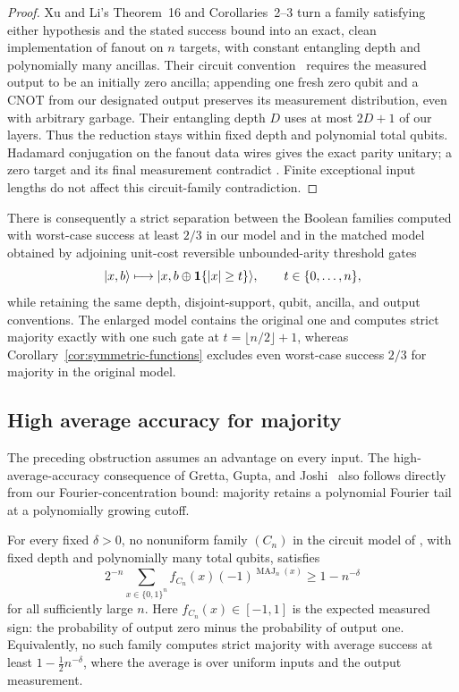 \begin{proof}
Xu and Li's Theorem~16 and Corollaries~2--3
\cite{XuLi2026Fanout} turn a family satisfying either hypothesis and the
stated success bound into an exact, clean implementation of fanout on
\(n\) targets, with constant entangling depth and polynomially many
ancillas. Their circuit convention~\cite[Section~2.3]{XuLi2026Fanout}
requires the measured output to be an initially zero ancilla; appending one fresh zero qubit and a CNOT from our designated
output preserves its measurement distribution, even with arbitrary
garbage. Their entangling depth \(D\) uses at most \(2D+1\) of our layers.
Thus the reduction stays within fixed depth and polynomial total qubits.
Hadamard conjugation on the fanout data wires gives the exact parity
unitary; a zero target and its final measurement contradict
. Finite exceptional input lengths do not affect this
circuit-family contradiction.
\end{proof}

There is consequently a strict separation between the Boolean families
computed with worst-case success at least \(2/3\) in our model and in the
matched model obtained by adjoining unit-cost reversible unbounded-arity
threshold gates
\[
 \lvert x,b\rangle\longmapsto
 \lvert x,b\mathbin{\oplus}\mathbf 1\{|x|\ge t\}\rangle,
 \qquad t\in\{0,\ldots,n\},
\]
while retaining the same depth, disjoint-support, qubit, ancilla, and
output conventions. The enlarged model contains the original one and
computes strict majority exactly with one such gate at
\(t=\lfloor n/2\rfloor+1\), whereas
Corollary~\ref{cor:symmetric-functions} excludes even worst-case success \(2/3\)
for majority in the original model.

\subsection{High average accuracy for majority}

The preceding obstruction assumes an advantage on every input. The
high-average-accuracy consequence of Gretta, Gupta, and
Joshi~\cite[Corollary~4.6]{GGJ2026} also follows directly from our
Fourier-concentration bound: majority retains a polynomial Fourier tail
at a polynomially growing cutoff.

\begin{corollary}
\label{cor:majority-average}
For every fixed \(\delta>0\), no nonuniform family \((C_n)\) in the
circuit model of , with fixed depth and polynomially
many total qubits, satisfies
\[
 2^{-n}\sum_{x\in\{0,1\}^n}
 f_{C_n}(x)(-1)^{\operatorname{MAJ}_n(x)}\ge1-n^{-\delta}
\]
for all sufficiently large \(n\). Here \(f_{C_n}(x)\in[-1,1]\) is
the expected measured sign: the probability of output zero minus the
probability of output one. Equivalently, no such family computes strict
majority with average success at least \(1-\tfrac12 n^{-\delta}\),
where the average is over uniform inputs and the output measurement.
\end{corollary}

